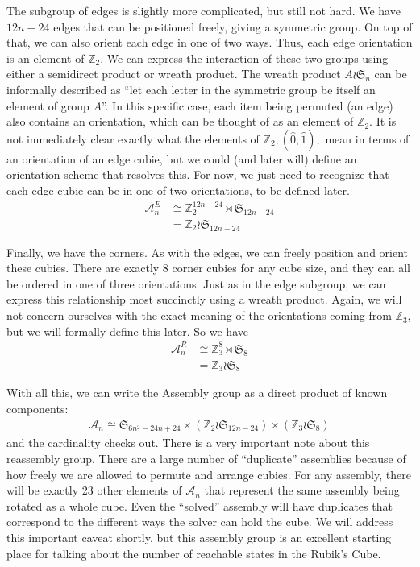 \documentclass[10pt,letterpaper]{report}
\begin{document}
The subgroup of edges is slightly more complicated, but still not hard.  We have $12n-24$ edges that can be positioned freely, giving a symmetric group.  On top of that, we can also orient each edge in one of two ways.  Thus, each edge orientation is an element of $\mathbb{Z}_2$.  We can express the interaction of these two groups using either a semidirect product or wreath product.  The wreath product $A \wr \mathfrak{S}_n$ can be informally described as ``let each letter in the symmetric group be itself an element of group $A$''.  In this specific case, each item being permuted (an edge) also contains an orientation, which can be thought of as an element of $\mathbb{Z}_2$.  It is not immediately clear exactly what the elements of $\mathbb{Z}_2, (\hat{0}, \hat{1}),$ mean in terms of an orientation of an edge cubie, but we could (and later will) define an orientation scheme that resolves this.  For now, we just need to recognize that each edge cubie can be in one of two orientations, to be defined later.
\begin{align*}
\mathcal{A}_n^E 
&\cong\mathbb{Z}_2^{12n-24} \rtimes \mathfrak{S}_{12n-24} \\
&= \mathbb{Z}_2 \wr \mathfrak{S}_{12n-24}
\end{align*}

Finally, we have the corners.  As with the edges, we can freely position and orient these cubies.  There are exactly 8 corner cubies for any cube size, and they can all be ordered in one of three orientations.  Just as in the edge subgroup, we can express this relationship most succinctly using a wreath product.  Again, we will not concern ourselves with the exact meaning of the orientations coming from $\mathbb{Z}_3$, but we will formally define this later.  So we have \begin{align*}
\mathcal{A}_n^R
&\cong\mathbb{Z}_3^8 \rtimes \mathfrak{S}_8 \\
&= \mathbb{Z}_3 \wr \mathfrak{S}_8
\end{align*}

With all this, we can write the Assembly group as a direct product of known components:
\begin{align*}
\mathcal{A}_n \cong
\mathfrak{S}_{6n^2 - 24n + 24} \times
(\mathbb{Z}_2 \wr \mathfrak{S}_{12n-24}) \times
(\mathbb{Z}_3 \wr \mathfrak{S}_8)
\end{align*}
and the cardinality checks out.  There is a very important note about this reassembly group.  There are a large number of ``duplicate'' assemblies because of how freely we are allowed to permute and arrange cubies.  For any assembly, there will be exactly 23 other elements of $\mathcal{A}_n$ that represent the same assembly being rotated as a whole cube.  Even the ``solved'' assembly will have duplicates that correspond to the different ways the solver can hold the cube.  We will address this important caveat shortly, but this assembly group is an excellent starting place for talking about the number of reachable states in the Rubik's Cube.\\
\end{document}
